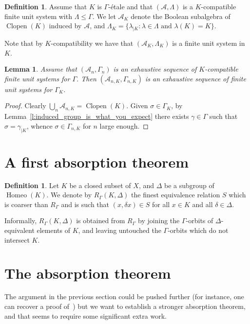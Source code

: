 \documentclass[10pt,a4paper]{article}
\newtheorem{lemm}[theo]{Lemma}
\theoremstyle{definition}
\newtheorem{defi}[theo]{Definition}
\DeclareMathOperator{\Homeo}{Homeo}
\DeclareMathOperator{\Clopen}{Clopen}
\newcommand{\mcA}{\mathcal{A}}
\begin{document}
\begin{defi}
Assume that $K$ is $\Gamma$-étale and that $(\mcA,\Lambda)$ is a $K$-compatible finite unit system with $\Lambda \le \Gamma$. We let $\mcA_K$ denote the Boolean subalgebra of $\Clopen(K)$ induced by $\mcA$, and $\Lambda_K=\{\lambda_{|K} : \lambda\in \Lambda \text{ and } \lambda(K)=K\}$.

Note that by $K$-compatibility we have that $(\mcA_K,\Lambda_K)$ is a finite unit system in $K$.
\end{defi}

\begin{lemm}
Assume that $(\mcA_n,\Gamma_n)$ is an exhaustive sequence of $K$-compatible finite unit systems for $\Gamma$. Then $(\mcA_{n,K},\Gamma_{n,K})$ is an exhaustive sequence of finite unit systems for $\Gamma_K$.
\end{lemm}

\begin{proof}
Clearly $\bigcup_n \mcA_{n,K}=\Clopen(K)$. Given $\sigma \in \Gamma_K$, by Lemma~\ref{l:induced_group_is_what_you_expect} there exists $\gamma \in \Gamma$ such that $\sigma=\gamma_{|K}$, whence $\sigma \in \Gamma_{n,K}$ for $n$ large enough.
\end{proof}

\setcounter{section}{4}

\section{A first absorption theorem}
\begin{defi}
Let $K$ be a closed subset of $X$, and $\Delta$ be a subgroup of $\Homeo(K)$. We denote by $R_\Gamma(K,\Delta)$ the finest equivalence relation $S$ which is coarser than $R_\Gamma$ and is such that $(x,\delta x) \in S$ for all $x \in K$ and all $\delta \in \Delta$.
\end{defi}

Informally, $R_\Gamma(K,\Delta)$ is obtained from $R_\Gamma$ by joining the $\Gamma$-orbits of $\Delta$-equivalent elements of $K$, and leaving untouched the $\Gamma$-orbits which do not intersect $K$.

\setcounter{section}{5}

\section{The absorption theorem}

The argument in the previous section could be pushed further (for instance, one can recover a proof of~\cite[Theorem~6.4]{Melleray2023}) but we want to establish a stronger absorption theorem, and that seems to require some significant extra work.
\end{document}
